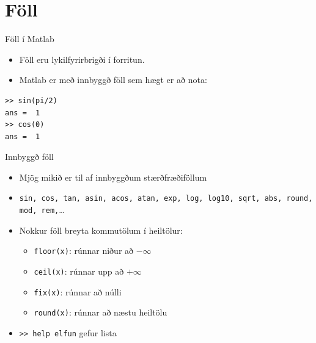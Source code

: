 \documentclass[handout]{beamer}
\begin{document}
\section{Föll}


\begin{frame}[fragile]{Föll í Matlab}
\begin{itemize}
 \item Föll eru lykilfyrirbrigði í forritun.
 \item Matlab er með innbyggð föll sem hægt er að nota:
\end{itemize}
\begin{verbatim}
>> sin(pi/2)
ans =  1
>> cos(0)
ans =  1
\end{verbatim}
\end{frame}

\begin{frame}{Innbyggð föll}
\begin{itemize}
 \item Mjög mikið er til af innbyggðum stærðfræðiföllum
 \item \texttt{sin, cos, tan, asin, acos, atan, exp, log, log10, sqrt, abs, round, mod, rem,}\ldots
 \item Nokkur föll breyta kommutölum í heiltölur:
 \begin{itemize}
  \item \texttt{floor(x)}: rúnnar niður að $-\infty$
  \item \texttt{ceil(x)}: rúnnar upp að $+\infty$
  \item \texttt{fix(x)}: rúnnar að núlli
  \item \texttt{round(x)}: rúnnar að næstu heiltölu
 \end{itemize}
 \item \texttt{>> help elfun} gefur lista
\end{itemize}
\end{frame}
\end{document}
